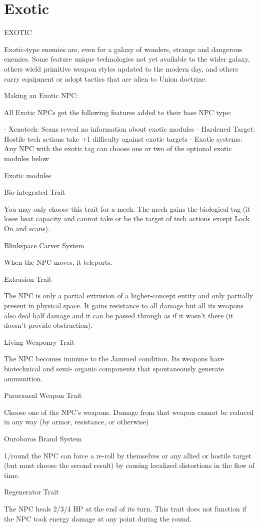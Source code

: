 \section{Exotic}
                                                      EXOTIC

Exotic-type enemies are, even for a galaxy of wonders, strange and dangerous enemies. Some
feature unique technologies not yet available to the wider galaxy, others wield primitive weapon
styles updated to the modern day, and others carry equipment or adopt tactics that are alien to
Union doctrine.


Making an Exotic NPC:

All Exotic NPCs get the following features added to their base NPC type:

     -   Xenotech: Scans reveal no information about exotic modules
     -   Hardened Target: Hostile tech actions take +1 difficulty against exotic targets
     -   Exotic systems: Any NPC with the exotic tag can choose one or two of the optional
         exotic modules below

Exotic modules

Bio-integrated
Trait

You may only choose this trait for a mech. The mech gains the biological tag (it loses heat
capacity and cannot take or be the target of tech actions except Lock On and scans).





Blinkspace Carver
System

When the NPC moves, it teleports.


Extrusion
Trait

The NPC is only a partial extrusion of a higher-concept entity and only partially present in
physical space. It gains resistance to all damage but all its weapons also deal half damage and it
can be passed through as if it wasn’t there (it doesn’t provide obstruction).


Living Weaponry
Trait

The NPC becomes immune to the Jammed condition. Its weapons have biotechnical and semi-
organic components that spontaneously generate ammunition.


Paracausal Weapon
Trait

Choose one of the NPC’s weapons. Damage from that weapon cannot be reduced in any way
(by armor, resistance, or otherwise)


Ouroboros Brand
System

1/round the NPC can force a re-roll by themselves or any allied or hostile target (but must choose
the second result) by causing localized distortions in the flow of time.


Regenerator
Trait

The NPC heals 2/3/4 HP at the end of its turn. This trait does not function if the NPC took energy
damage at any point during the round.